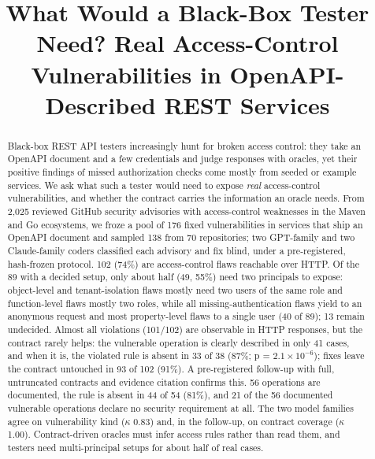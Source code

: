\documentclass[conference]{IEEEtran}
\begin{document}
\title{What Would a Black-Box Tester Need? Real Access-Control Vulnerabilities in OpenAPI-Described REST Services}
\author{}
\maketitle
\begin{abstract}
Black-box REST API testers increasingly hunt for broken access control: they take an OpenAPI document and a few credentials and judge responses with oracles, yet their positive findings of missed authorization checks come mostly from seeded or example services. We ask what such a tester would need to expose \emph{real} access-control vulnerabilities, and whether the contract carries the information an oracle needs. From 2,025 reviewed GitHub security advisories with access-control weaknesses in the Maven and Go ecosystems, we froze a pool of 176 fixed vulnerabilities in services that ship an OpenAPI document and sampled 138 from 70 repositories; two GPT-family and two Claude-family coders classified each advisory and fix blind, under a pre-registered, hash-frozen protocol. 102 (74\%) are access-control flaws reachable over HTTP. Of the 89 with a decided setup, only about half (49, 55\%) need two principals to expose: object-level and tenant-isolation flaws mostly need two users of the same role and function-level flaws mostly two roles, while all missing-authentication flaws yield to an anonymous request and most property-level flaws to a single user (40 of 89); 13 remain undecided. Almost all violations (101/102) are observable in HTTP responses, but the contract rarely helps: the vulnerable operation is clearly described in only 41 cases, and when it is, the violated rule is absent in 33 of 38 (87\%; p = $2.1 \times 10^{-6}$); fixes leave the contract untouched in 93 of 102 (91\%). A pre-registered follow-up with full, untruncated contracts and evidence citation confirms this. 56 operations are documented, the rule is absent in 44 of 54 (81\%), and 21 of the 56 documented vulnerable operations declare no security requirement at all. The two model families agree on vulnerability kind ($\kappa$ 0.83) and, in the follow-up, on contract coverage ($\kappa$ 1.00). Contract-driven oracles must infer access rules rather than read them, and testers need multi-principal setups for about half of real cases.
\end{abstract}
\end{document}

